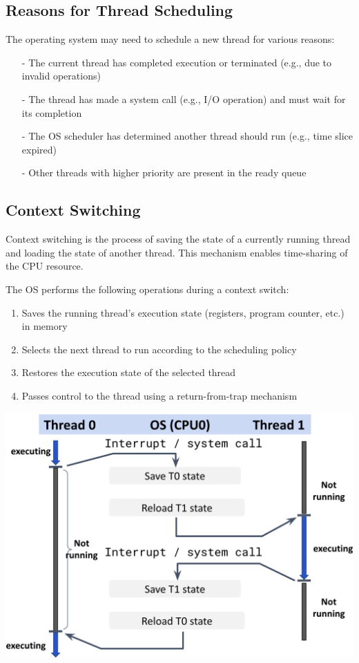 \documentclass[../../compsys.tex]{subfiles}
\begin{document}
\subsection{Reasons for Thread Scheduling}
The operating system may need to schedule a new thread for various reasons:
\begin{itemize}
    \item[-] The current thread has completed execution or terminated (e.g., due to invalid operations)
    \item[-] The thread has made a system call (e.g., I/O operation) and must wait for its completion
    \item[-] The OS scheduler has determined another thread should run (e.g., time slice expired)
    \item[-] Other threads with higher priority are present in the ready queue
\end{itemize}

\subsection{Context Switching}
Context switching is the process of saving the state of a currently running thread and loading the state of another thread. This mechanism enables time-sharing of the CPU resource.\\[5px]
\begin{minipage}[htp]{0.45\textwidth}
    The OS performs the following operations during a context switch:
    \begin{enumerate}
        \item Saves the running thread's execution state (registers, program counter, etc.) in memory
        \item Selects the next thread to run according to the scheduling policy
        \item Restores the execution state of the selected thread
        \item Passes control to the thread using a return-from-trap mechanism
    \end{enumerate}
\end{minipage}
\hfill
\begin{minipage}[htp]{0.45\textwidth}
    \centering
    \includegraphics[width=\textwidth]{images/context_switch.png}
\end{minipage}
\end{document}
